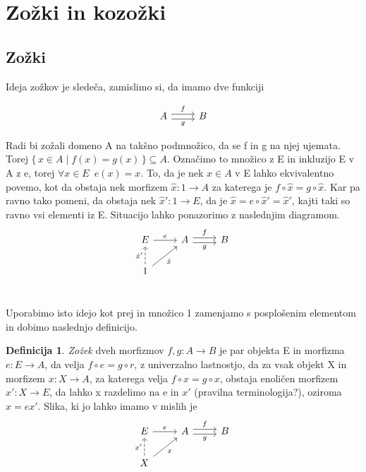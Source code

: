 \documentclass[12pt,a4paper]{book}
\theoremstyle{definition}
\newtheorem{definicija}{Definicija}[chapter]
\theoremstyle{plain}
\theoremstyle{definition}
\theoremstyle{remark}
\renewcommand{\set}[1]{\{\,#1\,\}}
\begin{document}

\section{Zožki in kozožki}

\subsection{Zožki}
Ideja zožkov je sledeča, zamislimo si, da imamo dve funkciji

$$\begin{tikzcd}
A \ar[r, shift left, "f"] \ar[r, shift right, "g"'] & B 
\end{tikzcd}$$

Radi bi zožali domeno A na takšno podmnožico, da se f in g na njej ujemata. Torej $\set{x \in A \mid f(x) = g(x)} \subseteq A$. Označimo to množico z E in inkluzijo E v A z e, torej $\forall x \in E \enspace e(x)= x $. To, da je nek $x \in A$ v E lahko ekvivalentno povemo, kot da obstaja nek morfizem $\hat{x} : 1 \to A$ za katerega je $f \circ \hat{x} = g \circ \hat{x}$. Kar pa ravno tako pomeni, da obstaja nek $\hat{x}' : 1 \to E$, da je $\hat{x} = e \circ \hat{x}' = \hat{x}'$, kajti taki so ravno vsi elementi iz E. Situacijo lahko ponazorimo z naslednjim diagramom.
$$\begin{tikzcd}
E \ar[r, "e"] & A \ar[r, shift left, "f"] \ar[r, shift right, "g"'] & B \\
1 \ar[u, dashed, "\hat{x}'"] \ar[ur, "\hat{x}"'] \\
\end{tikzcd}$$

Uporabimo isto idejo kot prej in množico 1 zamenjamo s posplošenim elementom in dobimo naslednjo definicijo.

\begin{definicija}
\textit{Zožek} dveh morfizmov $f, g : A \to B$ je par objekta E in morfizma $e : E \to A$, da velja $f \circ e = g \circ r$, z univerzalno lastnostjo, da za vsak objekt X in morfizem $x : X \to A$, za katerega velja $f \circ x = g \circ x$, obstaja enoličen morfizem $x' : X \to E$, da lahko x razdelimo na e in $x'$ (pravilna terminologija?), oziroma $x = ex'$.
Slika, ki jo lahko imamo v mislih je
$$\begin{tikzcd}
E \ar[r, "e"] & A \ar[r, shift left, "f"] \ar[r, shift right, "g"'] & B \\
X \ar[u, dashed, "x'"] \ar[ur, "x"']
\end{tikzcd}$$

\end{definicija}
\end{document}
